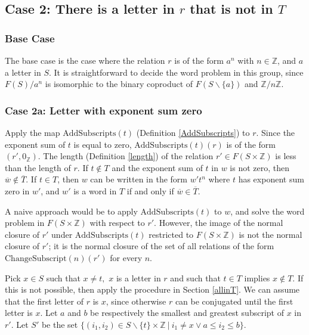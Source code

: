 \documentclass[11pt]{article} %
\theoremstyle{definition}
\theoremstyle{definition}
\theoremstyle{definition}
\theoremstyle{definition}
\theoremstyle{definition}
\theoremstyle{definition}
\begin{document}
\subsection{Case 2: There is a letter in $r$ that is not in $T$}
\subsubsection{Base Case}
The base case is the case where the relation $r$ is of the form $a^n$ with
$n \in \mathbb{Z}$, and $a$ a letter in $S$. It is straightforward to decide
the word problem in this group, since $F(S) / a^n$ is isomorphic
to the binary coproduct of $F(S \backslash \{a\})$ and $\mathbb{Z}/n\mathbb{Z}$.

\subsubsection{Case 2a: Letter with exponent sum zero}\label{expsumzero}
Apply the map $\text{AddSubscripts}(t)$ (Definition \ref{AddSubscripts}) to $r$.
Since the exponent sum of $t$ is equal to zero, $\text{AddSubscripts}(t)(r)$ is
of the form $(r', 0_\mathbb{Z})$.
The length (Definition \ref{length}) of the relation $r' \in F(S \times \mathbb{Z})$
is less than the length of $r$.
If $t \notin T$ and the exponent sum of $t$ in $w$ is not zero,
then $\overline{w} \notin \overline{T}$.
If $t \in T$, then $w$ can be written in the
form $w' t^n$ where $t$ has exponent sum zero in $w'$, and $w'$ is a word in $T$ if
and only if $\overline{w} \in \overline{T}$.

A naive approach would be to apply $\text{AddSubscripts}(t)$ to $w$, and solve the word
problem in $F(S \times \mathbb{Z})$ with respect to $r'$. However, the image of the normal closure of $r'$ under $\text{AddSubscripts}(t)$ restricted
to $F(S \times \mathbb{Z})$ is not the normal closure of $r'$; it is the normal closure of
the set of all relations of the form $\text{ChangeSubscript}(n)(r')$ for every $n$.

Pick $x \in S$ such that $x \ne t,$
  $x$ is a letter in $r$ and such that $t \in T$ implies $x \notin T$.
  If this is not possible, then apply the procedure in Section \ref{allinT}.
  We can assume that the first letter of $r$ is
$x$, since otherwise $r$ can be conjugated until the first letter is $x$.
Let $a$ and $b$ be respectively the
smallest and greatest subscript of $x$ in $r'$. Let $S'$ be the set
$\{(i_1, i_2) \in S \backslash \{t\} \times \mathbb{Z} \ | \ i_1 \ne x \vee a \le i_2 \le b \}$.
\end{document}
